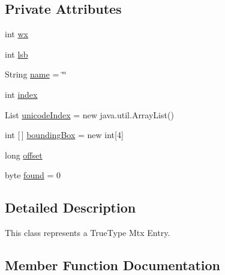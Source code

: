 \subsection*{Private Attributes}
\begin{DoxyCompactItemize}
\item 
int \mbox{\hyperlink{classorg_1_1newdawn_1_1slick_1_1tools_1_1hiero_1_1truetype_1_1_t_t_f_mtx_entry_a5bc1ab50560fc19a1bac9dab1b6443b0}{wx}}
\item 
int \mbox{\hyperlink{classorg_1_1newdawn_1_1slick_1_1tools_1_1hiero_1_1truetype_1_1_t_t_f_mtx_entry_aaca5842e9a52bb9d60209e558dd2f8bf}{lsb}}
\item 
String \mbox{\hyperlink{classorg_1_1newdawn_1_1slick_1_1tools_1_1hiero_1_1truetype_1_1_t_t_f_mtx_entry_ae97e3e4402e1061ce454dedc52a1cab4}{name}} = \char`\"{}\char`\"{}
\item 
int \mbox{\hyperlink{classorg_1_1newdawn_1_1slick_1_1tools_1_1hiero_1_1truetype_1_1_t_t_f_mtx_entry_ac037daf319dec24b16cad78d36505084}{index}}
\item 
List \mbox{\hyperlink{classorg_1_1newdawn_1_1slick_1_1tools_1_1hiero_1_1truetype_1_1_t_t_f_mtx_entry_add03c08bc04f69d6e73abd73171dd57b}{unicode\+Index}} = new java.\+util.\+Array\+List()
\item 
int \mbox{[}$\,$\mbox{]} \mbox{\hyperlink{classorg_1_1newdawn_1_1slick_1_1tools_1_1hiero_1_1truetype_1_1_t_t_f_mtx_entry_a7a0560528ae8fca8245ac8ee8de2714e}{bounding\+Box}} = new int\mbox{[}4\mbox{]}
\item 
long \mbox{\hyperlink{classorg_1_1newdawn_1_1slick_1_1tools_1_1hiero_1_1truetype_1_1_t_t_f_mtx_entry_a85ab264e853728a03b18417ab1511575}{offset}}
\item 
byte \mbox{\hyperlink{classorg_1_1newdawn_1_1slick_1_1tools_1_1hiero_1_1truetype_1_1_t_t_f_mtx_entry_ad1a3b3d97c0f3c15b408e732fcf42d15}{found}} = 0
\end{DoxyCompactItemize}


\subsection{Detailed Description}
This class represents a True\+Type Mtx Entry. 

\subsection{Member Function Documentation}
\mbox{\label{classorg_1_1newdawn_1_1slick_1_1tools_1_1hiero_1_1truetype_1_1_t_t_f_mtx_entry_ad9549a7740d3eb24d72c6351b047e3aa}} 

